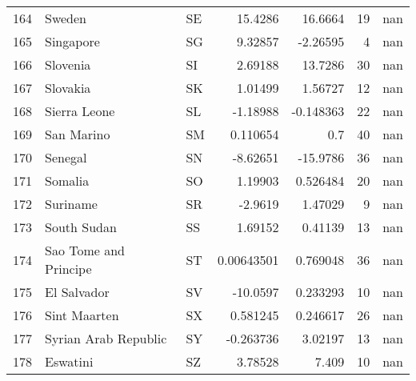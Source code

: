 \begin{tabular}{rllrrrr}
 164 & Sweden                                                   & SE         &   15.4286     &   16.6664     &     19 &    nan       \\
 165 & Singapore                                                & SG         &    9.32857    &   -2.26595    &      4 &    nan       \\
 166 & Slovenia                                                 & SI         &    2.69188    &   13.7286     &     30 &    nan       \\
 167 & Slovakia                                                 & SK         &    1.01499    &    1.56727    &     12 &    nan       \\
 168 & Sierra Leone                                             & SL         &   -1.18988    &   -0.148363   &     22 &    nan       \\
 169 & San Marino                                               & SM         &    0.110654   &    0.7        &     40 &    nan       \\
 170 & Senegal                                                  & SN         &   -8.62651    &  -15.9786     &     36 &    nan       \\
 171 & Somalia                                                  & SO         &    1.19903    &    0.526484   &     20 &    nan       \\
 172 & Suriname                                                 & SR         &   -2.9619     &    1.47029    &      9 &    nan       \\
 173 & South Sudan                                              & SS         &    1.69152    &    0.41139    &     13 &    nan       \\
 174 & Sao Tome and Principe                                    & ST         &    0.00643501 &    0.769048   &     36 &    nan       \\
 175 & El Salvador                                              & SV         &  -10.0597     &    0.233293   &     10 &    nan       \\
 176 & Sint Maarten                                             & SX         &    0.581245   &    0.246617   &     26 &    nan       \\
 177 & Syrian Arab Republic                                     & SY         &   -0.263736   &    3.02197    &     13 &    nan       \\
 178 & Eswatini                                                 & SZ         &    3.78528    &    7.409      &     10 &    nan       \\

\end{tabular}
